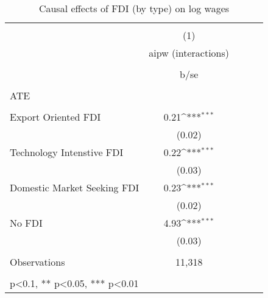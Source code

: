 \begin{table}
	\def\sym#1{\ifmmode^{#1}\else\(^{#1}\)\fi}
	\centering
	\caption{Causal effects of FDI (by type) on log wages}
	\label{4_table2}
	\begin{tabular}{l*{1}{cccc}}
		\hline\hline
		&\multicolumn{1}{c}{}                                        \\
		& (1)   \\
		\
		&aipw (interactions)     \\
		\\
		&b/se       \\
		\hline
		\\
		ATE \\
		\\
		Export Oriented FDI &       0.21\sym{***}   \\
		&     (0.02)        \\
		Technology Intenstive FDI&       0.22\sym{***} \\
		&     (0.03)         \\
		Domestic Market Seeking FDI&       0.23\sym{***}\\
		&     (0.02)   \\
		No FDI&       4.93\sym{***}\\
		&     (0.03)   \\
		\hline
		\\
		Observations        & 11,318          
		&                 &            \\
		\hline\hline
		\\
		\small * p<0.1, ** p<0.05, *** p<0.01
	\end{tabular} \\
\end{table}